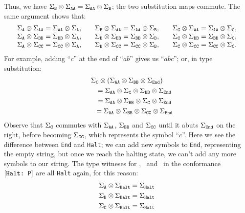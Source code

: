 \documentclass[../generics]{subfiles}
\begin{document}
Thus, we have $\Sigma_{\texttt{B}}\otimes\Sigma_{\texttt{AA}} = \Sigma_{\texttt{AA}}\otimes\Sigma_{\texttt{B}}$; the two substitution maps commute. The same argument shows that:
\[
\begin{array}{lllll}
\Sigma_{\texttt{A}}\otimes\Sigma_{\texttt{AA}}=\Sigma_{\texttt{AA}}\otimes\Sigma_{\texttt{A}},&&\Sigma_{\texttt{B}}\otimes\Sigma_{\texttt{AA}}=\Sigma_{\texttt{AA}}\otimes\Sigma_{\texttt{B}},&&\Sigma_{\texttt{C}}\otimes\Sigma_{\texttt{AA}}=\Sigma_{\texttt{AA}}\otimes\Sigma_{\texttt{C}},\\
\Sigma_{\texttt{A}}\otimes\Sigma_{\texttt{BB}}=\Sigma_{\texttt{BB}}\otimes\Sigma_{\texttt{A}},&&\Sigma_{\texttt{B}}\otimes\Sigma_{\texttt{BB}}=\Sigma_{\texttt{BB}}\otimes\Sigma_{\texttt{B}},&&\Sigma_{\texttt{C}}\otimes\Sigma_{\texttt{BB}}=\Sigma_{\texttt{BB}}\otimes\Sigma_{\texttt{C}},\\
\Sigma_{\texttt{A}}\otimes\Sigma_{\texttt{CC}}=\Sigma_{\texttt{CC}}\otimes\Sigma_{\texttt{A}},&&\Sigma_{\texttt{B}}\otimes\Sigma_{\texttt{CC}}=\Sigma_{\texttt{CC}}\otimes\Sigma_{\texttt{B}},&&\Sigma_{\texttt{C}}\otimes\Sigma_{\texttt{CC}}=\Sigma_{\texttt{CC}}\otimes\Sigma_{\texttt{C}}.\\
\end{array}
\]
For example, adding ``$c$'' at the end of ``$ab$'' gives us ``$abc$''; or, in type substitution:
\begin{gather*}
\Sigma_{\texttt{C}}\otimes\left(\Sigma_{\texttt{AA}}\otimes\Sigma_{\texttt{BB}}\otimes\Sigma_{\texttt{End}}\right)\\
\qquad {} = \Sigma_{\texttt{AA}}\otimes\Sigma_{\texttt{C}}\otimes\Sigma_{\texttt{BB}}\otimes\Sigma_{\texttt{End}}\\
\qquad {} = \Sigma_{\texttt{AA}}\otimes\Sigma_{\texttt{BB}}\otimes\Sigma_{\texttt{C}}\otimes\Sigma_{\texttt{End}}\\
\qquad {} = \Sigma_{\texttt{AA}}\otimes\Sigma_{\texttt{BB}}\otimes\Sigma_{\texttt{CC}}\otimes\Sigma_{\texttt{End}}
\end{gather*}
Observe that $\Sigma_{\texttt{C}}$ commutes with $\Sigma_{\texttt{AA}}$, $\Sigma_{\texttt{BB}}$ and $\Sigma_{\texttt{CC}}$ until it abuts $\Sigma_{\texttt{End}}$ on the right, before becoming $\Sigma_{\texttt{CC}}$, which represents the symbol ``$c$''. Here we see the difference between \texttt{End} and \texttt{Halt}; we can add new symbols to \texttt{End}, representing the empty string, but once we reach the halting state, we can't add any more symbols to our string. The type witneses for \nA, \nB\ and \nC\ in the conformance $[\texttt{Halt:~P}]$ are all \texttt{Halt} again, for this reason:
\begin{gather*}
\Sigma_{\texttt{A}}\otimes\Sigma_{\texttt{Halt}}=\Sigma_{\texttt{Halt}}\\
\Sigma_{\texttt{B}}\otimes\Sigma_{\texttt{Halt}}=\Sigma_{\texttt{Halt}}\\
\Sigma_{\texttt{C}}\otimes\Sigma_{\texttt{Halt}}=\Sigma_{\texttt{Halt}}
\end{gather*}
\end{document}
